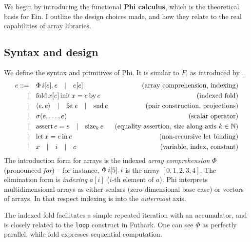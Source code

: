 We begin by introducing the functional \textbf{Phi calculus}, which is the theoretical basis for Ein. I outline the design choices made, and how they relate to the real capabilities of array libraries.

\subsection{Syntax and design}

\newcommand{\philet}[3]{\mathrm{let}\,{#1}={#2}\,\mathrm{in}\,{#3}}
\newcommand{\phivec}[3]{\Phi\, {#1}[{#2}] \ldotp {#3}}
\newcommand{\phifold}[5]{\mathrm{fold}\,{#1}[{#2}]\,\mathrm{init}\,{#3} = {#4}\,\mathrm{by}\,{#5}}
\newcommand{\phipair}[2]{\left\langle {#1}, {#2} \right\rangle}
\newcommand{\phifst}[1]{\mathrm{fst}\,{#1}}
\newcommand{\phisnd}[1]{\mathrm{snd}\,{#1}}
\newcommand{\phisize}[2]{\mathrm{size}_{#2}\, {#1}}
\newcommand{\phiasserteq}[2]{\mathrm{assert}\,{#1}={#2}}

We define the syntax and primitives of Phi. It is similar to $\tilde F$, as introduced by \textcite{shaikhha2019efficient}.
\begin{align*}
e ::=&\quad \phivec{i}{e}{e} \quad|\quad e[e]   &\text{(array comprehension, indexing)} \\
|&\quad \phifold{x}{e}{x}{e}{e}  &\text{(indexed fold)} \\
|&\quad \phipair{e}{e} \quad|\quad \phifst{e} \quad|\quad \phisnd{e} &\text{(pair construction, projections)} \\
|&\quad \sigma(e, \dots, e) &\text{(scalar operator)} \\
|&\quad \phiasserteq{e}{e} \quad|\quad \phisize{e}{k} &\text{(equality assertion, size along axis } k \in \mathbb N \text{)} \\
|&\quad \philet{x}{e}{e} &\text{(non-recursive let binding)} \\
|&\quad x \quad|\quad i \quad|\quad c &\text{(variable, index, constant)}
\end{align*}
The introduction form for arrays is the indexed \textit{array comprehension} $\Phi$ (pronounced \textit{for}) -- for instance, $\phivec{i}{5}{i}$ is the array $[0, 1, 2, 3, 4]$. The elimination form is \textit{indexing} $a[i]$ ($i$-th element of $a$). Phi interprets multidimensional arrays as either scalars (zero-dimensional base case) or vectors of arrays. In that respect indexing is into the \textit{outermost} axis. 

The indexed fold facilitates a simple repeated iteration with an accumulator, and is closely related to the \texttt{loop} construct in Futhark. One can see $\Phi$ as perfectly parallel, while $\mathrm{fold}$ expresses sequential computation.

